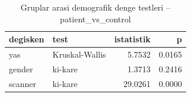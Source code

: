 \begin{table}[htbp]
  \centering
  \caption{Gruplar arasi demografik denge testleri -- patient\_vs\_control}
  \label{tab:balance_patient_vs_control}
  \small
  \begin{tabular}{llrr}
    \toprule
    degisken & test & istatistik & p \\
    \midrule
    yas & Kruskal-Wallis & 5.7532 & 0.0165 \\
    gender & ki-kare & 1.3713 & 0.2416 \\
    scanner & ki-kare & 29.0261 & 0.0000 \\
    \bottomrule
  \end{tabular}
\end{table}
